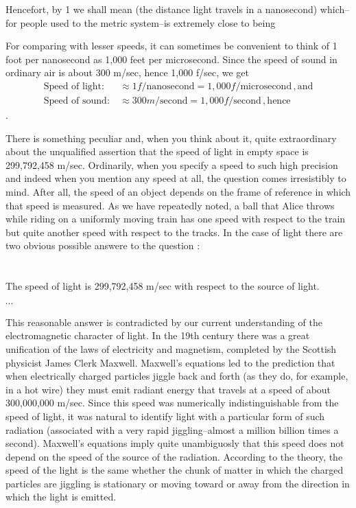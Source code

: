 Hencefort, by 1  we shall mean  (the distance light travels in a nanosecond) which--for people used to the metric system--is extremely close to being 

For comparing with lesser speeds, it can sometimes be convenient to think of 1 foot per nanosecond as 1,000 feet per microsecond. Since the speed of sound in ordinary air is about 300 m/sec, hence 1,000 f/sec, we get
\begin{equation*}
\begin{aligned}
\text{Speed of light:}\: &\approx	1 f/\text{nanosecond} = 1,000 f/\text{microsecond}\,,	\text{and}	\\
\text{Speed of sound:}\: &\approx 300 m/\text{second} = 1,000 f/\text{second}\,, \text{hence}
\end{aligned}
\end{equation*}
.  

There is something peculiar and, when you think about it, quite extraordinary about the unqualified assertion that the speed of light in empty space is 299,792,458 m/sec. Ordinarily, when you specify a speed to such high precision and indeed when you mention any speed at all, the question  comes irresistibly to mind. After all, the speed of an object depends on the frame of reference in which that speed is measured. As we have repeatedly noted, a ball that Alice throws while riding on a uniformly moving train has one speed with respect to the train but quite another speed with respect to the tracks. In the case of light there are two obvious possible answere to the question :
\\\\\\

The speed of light is 299,792,458 m/sec with respect to the source of light.

$\cdots$

This reasonable answer is contradicted by our current understanding of the electromagnetic character of light. In the 19th century there was a great unification of the laws of electricity and magnetism, completed by the Scottish physicist James Clerk Maxwell. Maxwell's equations led to the prediction that when electrically charged particles jiggle back and forth (as they do, for example, in a hot wire) they must emit radiant energy that travels at a speed of about 300,000,000 m/sec. Since this speed was numerically indistinguishable from the speed of light, it was natural to identify light with a particular form of such radiation (associated with a very rapid jiggling--almost a million billion times a second). Maxwell's equations imply quite unambiguosly that this speed does not depend on the speed of the source of the radiation. According to the theory, the speed of the light is the same whether the chunk of matter in which the charged particles are jiggling is stationary or moving toward or away from the direction in which the light is emitted.

